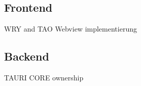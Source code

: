 \subsection{Frontend}
\label{subsec:tauri:frontend}
WRY and TAO
Webview implementierung
\subsection{Backend}
\label{subsec:tauri:backend}
TAURI CORE
ownership

